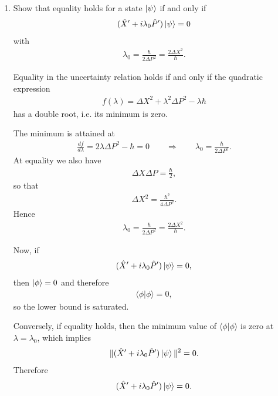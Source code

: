 \documentclass[11pt,a4paper]{scrartcl}
\begin{document}
\begin{enumerate}[label=(\alph*)]
    \item Show that equality holds for a state $\ket{\psi}$ if and only if
    \begin{align*}
        (\hat{X}' + i\lambda_0 \hat{P}')\ket{\psi} = 0
    \end{align*}
    with
    \begin{align*}
        \lambda_0 = \frac{\hbar}{2\Delta P^2} = \frac{2\Delta X^2}{\hbar}.
    \end{align*}
    \begin{calculationbox}
        Equality in the uncertainty relation holds if and only if the quadratic expression
        \begin{align*}
            f(\lambda) = \Delta X^2 + \lambda^2 \Delta P^2 - \lambda \hbar
        \end{align*}
        has a double root, i.e. its minimum is zero.

        The minimum is attained at
        \begin{align*}
            \frac{d f}{d\lambda} = 2\lambda \Delta P^2 - \hbar = 0
            \qquad \Longrightarrow \qquad
            \lambda_0 = \frac{\hbar}{2\Delta P^2}.
        \end{align*}
        At equality we also have
        \begin{align*}
            \Delta X \Delta P = \frac{\hbar}{2},
        \end{align*}
        so that
        \begin{align*}
            \Delta X^2 = \frac{\hbar^2}{4\Delta P^2}.
        \end{align*}
        Hence
        \begin{align*}
            \lambda_0 = \frac{\hbar}{2\Delta P^2} = \frac{2\Delta X^2}{\hbar}.
        \end{align*}

        Now, if
        \begin{align*}
            (\hat{X}' + i\lambda_0 \hat{P}')\ket{\psi} = 0,
        \end{align*}
        then $\ket{\phi}=0$ and therefore
        \begin{align*}
            \langle \phi | \phi \rangle = 0,
        \end{align*}
        so the lower bound is saturated.

        Conversely, if equality holds, then the minimum value of $\langle \phi|\phi\rangle$ is zero at $\lambda=\lambda_0$, which implies
        \begin{align*}
            \|(\hat{X}' + i\lambda_0 \hat{P}')\ket{\psi}\|^2 = 0.
        \end{align*}
        Therefore
        \begin{align*}
            (\hat{X}' + i\lambda_0 \hat{P}')\ket{\psi} = 0.
        \end{align*}
    \end{calculationbox}


\end{enumerate}
\end{document}
